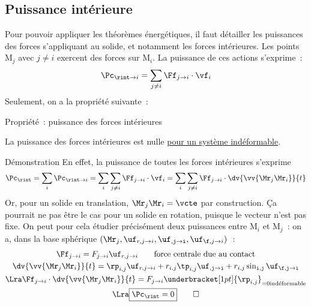 \documentclass[../main/main.tex]{subfiles}
\begin{document}
\subsection{Puissance intérieure}
Pour pouvoir appliquer les théorèmes énergétiques, il faut détailler les
puissances des forces s'appliquant au solide, et notamment les forces
intérieures. Les points M$_j$ avec $j\neq i$ exercent des forces sur M$_i$. La
puissance de ces actions s'exprime~:
\[\Pc_{\rint\to i} = \sum_{j\neq i} \Ff_{j\to i}\cdot\vf_i\]
Seulement, on a la propriété suivante~:
\begin{tprop}{Propriété~: puissance des forces intérieures}
    \begin{center}
        \begin{bfseries}
            La puissance des forces intérieures est nulle \ul{pour un système
            indéformable}.
        \end{bfseries}
    \end{center}
\end{tprop}
\begin{tdemo}{Démonstration}
    En effet, la puissance de toutes les forces intérieures s'exprime
    \[
        \Pc_{\rint} =
        \sum_i\Pc_{\rint\to i} =
        \sum_i\sum_{j\neq i}\Ff_{j\to i}\cdot \vf_i =
        \sum_i\sum_{j\neq i}\Ff_{j\to i}\cdot \dv{\vv{\Mr_j\Mr_i}}{t}
    \]
    Or, pour un solide en translation, $\Mr_j\Mr_i = \vcte$ par construction. Ça
    pourrait ne pas être le cas pour un solide en rotation, puisque le vecteur n'est
    pas fixe. On peut pour cela étudier précisément deux puissances entre M$_i$ et
    M$_j$~: on a, dans la base sphérique $(\Mr_j, \uf_{r,j\to i}, \uf_{\tt,j\to i},
    \uf_{\f,j\to i})$~:
    \begin{gather*}
        \Ff_{j\to i} = F_{j\to i}\uf_{r,j\to i} \qquad \text{force centrale due au
        contact}\\
        \dv{\vv{\Mr_j\Mr_i}}{t} = \rp_{i,j}\uf_{r,j\to i} +
        r_{i,j}\tp_{i,j}\uf_{\tt,j\to i} + r_{i,j}\sin\tt_{i,j}\uf_{\f,j\to i}
        \\\Lra
        \Ff_{j\to i}\cdot\dv{\vv{\Mr_j\Mr_i}}{t} = F_{j\to i}
        \underbracket[1pt]{\rp_{i,j}}_{=0 \text{indéformable}}
        \\\Lra
        \boxed{\Pc_{\rint} = 0}
        \qed
    \end{gather*}
\end{tdemo}
\end{document}
